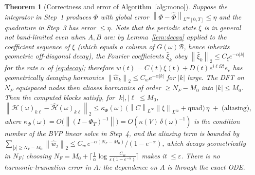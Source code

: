 \documentclass{amsart}
\newtheorem{theorem}{Theorem}
\theoremstyle{definition}
\newcommand{\norm}[1]{\left\lVert#1\right\rVert}
\newcommand{\Bcal}{\mathcal{B}}
\newcommand{\Hcal}{\mathcal{H}}
\begin{document}
\begin{theorem}[Correctness and error of Algorithm~\ref{alg:mono}]\label{thm:mono}
Suppose the integrator in Step~1 produces $\Phi$ with global error
$\norm{\Phi-\hat\Phi}_{L^\infty[0,T]}\le\eta$ and the quadrature in Step~3 has
error $\le\eta$. Note that the periodic state $\xi$ is in general \emph{not}
band-limited even when $A,B$ are: by Lemma~\ref{lem:decay} applied to the
coefficient sequence of $\xi$ (which equals a column of $G(\omega)\Bcal$, hence
inherits geometric off-diagonal decay), the Fourier coefficients $\hat\xi_k$
obey $\norm{\hat\xi_k}_2\le C_\xi e^{-\alpha|k|}$ for the rate $\alpha$ of
\eqref{eq:decay}; therefore $w(t)=C(t)\xi(t)+D(t)e^{i\ell\Omega t}e_c$ has
geometrically decaying harmonics $\norm{\hat w_k}_2\le C_w e^{-\alpha|k|}$ for
$|k|$ large. The DFT on $N_F$ equispaced nodes then aliases harmonics of order
$\ge N_F-M_0$ into $|k|\le M_0$. Then the
computed blocks satisfy, for $|k|,|\ell|\le M_0$,
\begin{equation}\label{eq:monoerr}
\norm{\Hcal(\omega)_{k\ell}-\widehat{\Hcal}(\omega)_{k\ell}}_2
\le \kappa_\Phi(\omega)\,\big(\norm{C}_{L^\infty}\norm{\xi}_{L^\infty}+\text{quad}\big)\,\eta
\;+\;\text{(aliasing)},
\end{equation}
where $\kappa_\Phi(\omega)=O\!\big(\norm{(I-\Phi_T)^{-1}}\big)
=O(\kappa(V)\,\delta(\omega)^{-1})$ is the condition number of the BVP linear solve in
Step~4, and the aliasing term is bounded by
$\sum_{|j|\ge N_F-M_0}\norm{\hat w_j}_2\le C_w\,e^{-\alpha(N_F-M_0)}/(1-e^{-\alpha})$,
which decays geometrically in $N_F$; choosing
$N_F=M_0+\lceil\tfrac1\alpha\log\tfrac{C_w}{\varepsilon(1-e^{-\alpha})}\rceil$
makes it $\le\varepsilon$. There is \emph{no} harmonic-truncation error in $A$:
the dependence on $A$ is through the exact ODE.
\end{theorem}
\end{document}
